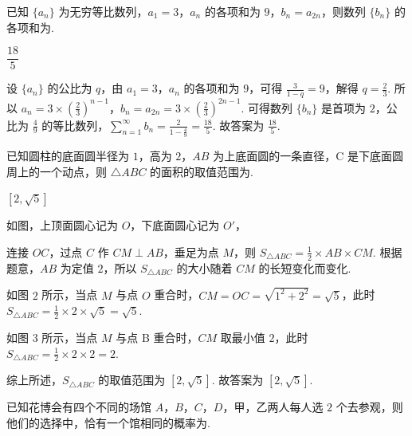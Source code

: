 \begin{problem}
已知 \(\{a_n\}\) 为无穷等比数列，\(a_1=3\)，\(a_n\) 的各项和为 \(9\)，\(b_n=a_{2n}\)，则数列 \(\{b_n\}\) 的各项和为\fillinblank{}.
\end{problem}

\begin{answer}
\(\dfrac{18}{5}\)
\end{answer}

\begin{solution}
设 \(\{a_n\}\) 的公比为 \(q\)，由 \(a_1=3\)，\(a_n\) 的各项和为 \(9\)，可得 \(\frac{3}{1-q}=9\)，解得 \(q=\frac23\). 所以 \(a_n=3\times \left( \frac23 \right)^{n-1}\)，\(b_n=a_{2n}=3\times \left( \frac23 \right)^{2n-1}\). 可得数列 \(\{b_n\}\) 是首项为 \(2\)，公比为 \(\frac49\) 的等比数列，\(\sum_{n=1}^{\infty} b_n=\frac{2}{1-\frac49}=\frac{18}{5}\). 故答案为 \(\frac{18}{5}\).
\end{solution}

\begin{problem}
已知圆柱的底面圆半径为 \(1\)，高为 \(2\)，\(AB\) 为上底面圆的一条直径，C 是下底面圆周上的一个动点，则 \(\triangle ABC\) 的面积的取值范围为\fillinblank{}.
\end{problem}

\begin{answer}
\([2,\sqrt5]\)
\end{answer}

\begin{solution}
如图，上顶面圆心记为 \(O\)，下底面圆心记为 \(O'\)，


连接 \(OC\)，过点 \(C\) 作 \(CM\perp AB\)，垂足为点 \(M\)，则 \(S_{\triangle ABC}=\frac12\times AB\times CM\). 根据题意，\(AB\) 为定值 \(2\)，所以 \(S_{\triangle ABC}\) 的大小随着 \(CM\) 的长短变化而变化.

如图 \(2\) 所示，当点 \(M\) 与点 \(O\) 重合时，\(CM=OC=\sqrt{1^2+2^2}=\sqrt5\)，此时 \(S_{\triangle ABC}=\frac12\times 2\times \sqrt5=\sqrt5\).

如图 \(3\) 所示，当点 \(M\) 与点 B 重合时，\(CM\) 取最小值 \(2\)，此时 \(S_{\triangle ABC}=\frac12\times 2\times 2=2\).

综上所述，\(S_{\triangle ABC}\) 的取值范围为 \([2,\sqrt5]\). 故答案为 \([2,\sqrt5]\).
\end{solution}

\begin{problem}
已知花博会有四个不同的场馆 \(A\)，\(B\)，\(C\)，\(D\)，甲，乙两人每人选 \(2\) 个去参观，则他们的选择中，恰有一个馆相同的概率为\fillinblank{}.
\end{problem}

